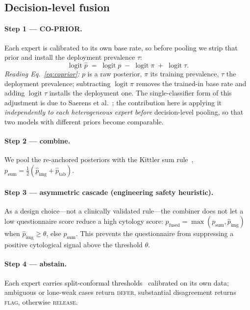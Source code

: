 \documentclass[sigplan,nonacm,screen]{acmart}
\begin{document}
\subsection{Decision-level fusion}\label{sec:fusmethod}
\paragraph{Step 1 --- CO-PRIOR.} Each expert is calibrated to its own base rate, so before pooling we strip
that prior and install the deployment prevalence $\tau$:
\begin{equation}\label{eq:coprior}
\operatorname{logit}\hat p \;=\; \operatorname{logit} p \;-\; \operatorname{logit}\pi \;+\; \operatorname{logit}\tau .
\end{equation}
\emph{Reading Eq.~\eqref{eq:coprior}:} $p$ is a raw posterior, $\pi$ its training prevalence, $\tau$ the
deployment prevalence; subtracting $\operatorname{logit}\pi$ removes the trained-in base rate and adding
$\operatorname{logit}\tau$ installs the deployment one. The single-classifier form of this adjustment is due
to Saerens et al.~\cite{saerens2002}; the contribution here is applying it \emph{independently to each
heterogeneous expert before} decision-level pooling, so that two models with different priors become
comparable.

\paragraph{Step 2 --- combine.} We pool the re-anchored posteriors with the Kittler sum
rule~\cite{kittler1998}, $p_{\mathrm{sum}}=\tfrac12(\hat p_{\mathrm{img}}+\hat p_{\mathrm{tab}})$.

\paragraph{Step 3 --- asymmetric cascade (engineering safety heuristic).} As a design choice---not a
clinically validated rule---the combiner does not let a low questionnaire score reduce a high cytology score:
$p_{\mathrm{fused}}=\max(p_{\mathrm{sum}},\hat p_{\mathrm{img}})$ when $\hat p_{\mathrm{img}}\ge\theta$, else
$p_{\mathrm{sum}}$. This prevents the questionnaire from suppressing a positive cytological signal above the
threshold $\theta$.

\paragraph{Step 4 --- abstain.} Each expert carries split-conformal thresholds~\cite{angelopoulos2023}
calibrated on its own data; ambiguous or lone-weak cases return \textsc{defer}, substantial disagreement returns
\textsc{flag}, otherwise \textsc{release}.
\end{document}
